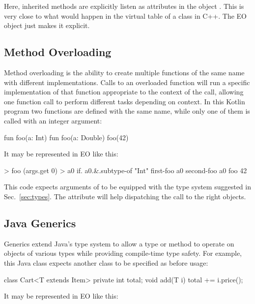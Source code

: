 \documentclass[sigplan,11pt,nonacm,natbib=false]{acmart}
\begin{document}
Here, inherited methods are explicitly listen as attributes in the object . This is very close to what would happen in the virtual table of a class  in C++. The EO object  just makes it explicit.

\subsection{Method Overloading}
\label{sec:overloading}

Method overloading is the ability to create multiple functions of the same name with different implementations. Calls to an overloaded function will run a specific implementation of that function appropriate to the context of the call, allowing one function call to perform different tasks depending on context. In this Kotlin program two functions are defined with the same name, while only one of them is called with an integer argument:

\begin{ffcode}
fun foo(a: Int) {}
fun foo(a: Double) {}
foo(42)
\end{ffcode}

It may be represented in EO like this:

\begin{ffcode}
[args...] > foo
  (args.get 0) > a0
  if.
    a0.&.subtype-of "Int"
    first-foo a0
    second-foo a0
foo 42
\end{ffcode}

This code expects arguments of  to be equipped with the type system suggested in Sec.~\ref{sec:types}. The attribute  will help dispatching the call to the right objects.

\subsection{Java Generics}
\label{sec:generics}

Generics extend Java's type system to allow a type or method to operate on objects of various types while providing compile-time type safety. For example, this Java class expects another class to be specified as  before usage: 

\begin{ffcode}
class Cart<T extends Item> {
  private int total;
  void add(T i) {
    total += i.price();
  }
} 
\end{ffcode}

It may be represented in EO like this:
\end{document}
